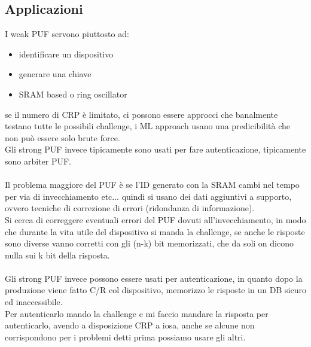 \documentclass[oneside, 12pt]{extbook}
\begin{document}
\subsection{Applicazioni}
I weak PUF servono piuttosto ad:
\begin{itemize}
	\item identificare un dispositivo
	\item generare una chiave
	\item SRAM based o ring oscillator
\end{itemize}
se il numero di CRP è limitato, ci possono essere approcci che banalmente testano tutte le possibili challenge, i ML approach usano una predicibilità che non può essere solo brute force.
\\Gli strong PUF invece tipicamente sono usati per fare autenticazione, tipicamente sono arbiter PUF.\\\\Il problema maggiore del PUF è se l'ID generato con la SRAM cambi nel tempo per via di invecchiamento etc... quindi si usano dei dati aggiuntivi a supporto, ovvero tecniche di correzione di errori (ridondanza di informazione).
\\Si cerca di correggere eventuali errori del PUF dovuti all'invecchiamento, in modo che durante la vita utile del dispositivo si manda la challenge, se anche le risposte sono diverse vanno corretti con gli (n-k) bit memorizzati, che da soli on dicono nulla sui k bit della risposta.
\\\\Gli strong PUF invece possono essere usati per autenticazione, in quanto dopo la produzione viene fatto C/R col dispositivo, memorizzo le risposte in un DB sicuro ed inaccessibile.
\\Per autenticarlo mando la challenge e mi faccio mandare la risposta per autenticarlo, avendo a disposizione CRP a iosa, anche se alcune non corrispondono per i problemi detti prima possiamo usare gli altri.
\end{document}
